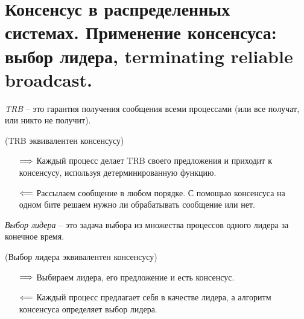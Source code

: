 \section{Консенсус в распределенных системах. Применение консенсуса: выбор лидера, terminating reliable broadcast.}

\begin{definition}
    \textit{TRB} -- это гарантия получения сообщения всеми процессами (или все получат, или никто не получит).
\end{definition}

\begin{algorithm} (TRB эквивалентен консенсусу)
    \begin{itemize}
        \item[$\Longrightarrow$] Каждый процесс делает TRB своего предложения и приходит к 
            консенсусу, используя детерминированную функцию.
        \item[$\Longleftarrow$] Рассылаем сообщение в любом порядке. С помощью консенсуса 
            на одном бите решаем нужно ли обрабатывать сообщение или нет.
    \end{itemize}
\end{algorithm}

\begin{definition}
    \textit{Выбор лидера} -- это задача выбора из множества процессов одного лидера за конечное время.
\end{definition}

\begin{algorithm} (Выбор лидера эквивалентен консенсусу)
    \begin{itemize}
    \item[$\Longrightarrow$] Выбираем лидера, его предложение и есть консенсус.
    \item[$\Longleftarrow$] Каждый процесс предлагает себя в качестве лидера, 
        а алгоритм консенсуса определяет выбор лидера.
    \end{itemize}
\end{algorithm}
